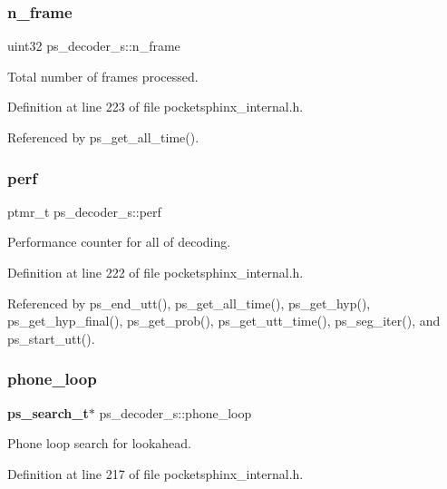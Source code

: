 \subsubsection{n\+\_\+frame}
{\footnotesize\ttfamily uint32 ps\+\_\+decoder\+\_\+s\+::n\+\_\+frame}



Total number of frames processed. 



Definition at line 223 of file pocketsphinx\+\_\+internal.\+h.



Referenced by ps\+\_\+get\+\_\+all\+\_\+time().

\mbox{\label{structps__decoder__s_ab42d1d1e300d2a6df5dd3cd796a27d43}} 
\subsubsection{perf}
{\footnotesize\ttfamily ptmr\+\_\+t ps\+\_\+decoder\+\_\+s\+::perf}



Performance counter for all of decoding. 



Definition at line 222 of file pocketsphinx\+\_\+internal.\+h.



Referenced by ps\+\_\+end\+\_\+utt(), ps\+\_\+get\+\_\+all\+\_\+time(), ps\+\_\+get\+\_\+hyp(), ps\+\_\+get\+\_\+hyp\+\_\+final(), ps\+\_\+get\+\_\+prob(), ps\+\_\+get\+\_\+utt\+\_\+time(), ps\+\_\+seg\+\_\+iter(), and ps\+\_\+start\+\_\+utt().

\mbox{\label{structps__decoder__s_a0c6d141d7a71a1287be00a1ebcc7643d}} 
\subsubsection{phone\+\_\+loop}
{\footnotesize\ttfamily \textbf{ ps\+\_\+search\+\_\+t}$\ast$ ps\+\_\+decoder\+\_\+s\+::phone\+\_\+loop}



Phone loop search for lookahead. 



Definition at line 217 of file pocketsphinx\+\_\+internal.\+h.



